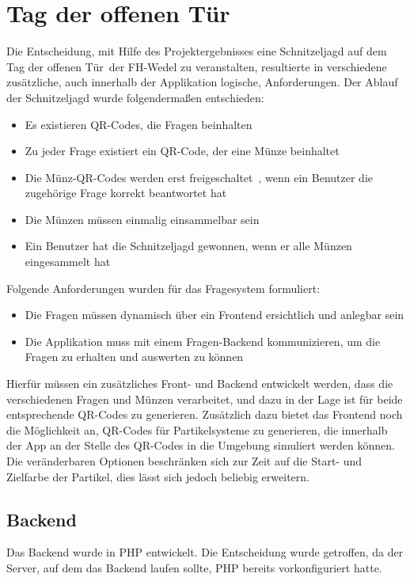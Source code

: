 \chapter{Tag der offenen Tür}

Die Entscheidung, mit Hilfe des Projektergebnisses eine Schnitzeljagd auf dem \glqq Tag der offenen Tür\grqq\ der FH-Wedel zu veranstalten, resultierte in verschiedene zusätzliche, auch innerhalb der Applikation logische, Anforderungen.
Der Ablauf der Schnitzeljagd wurde folgendermaßen entschieden:

\begin{itemize}
\item Es existieren QR-Codes, die Fragen beinhalten
\item Zu jeder Frage existiert ein QR-Code, der eine Münze beinhaltet
\item Die Münz-QR-Codes werden erst \glqq freigeschaltet\grqq\ , wenn ein Benutzer die zugehörige Frage korrekt beantwortet hat
\item Die Münzen müssen einmalig einsammelbar sein
\item Ein Benutzer hat die Schnitzeljagd gewonnen, wenn er alle Münzen eingesammelt hat
\end{itemize}
Folgende Anforderungen wurden für das Fragesystem formuliert:

\begin{itemize}
\item Die Fragen müssen dynamisch über ein Frontend ersichtlich und anlegbar sein
\item Die Applikation muss mit einem Fragen-Backend kommunizieren, um die Fragen zu erhalten und auswerten zu können
\end{itemize}

Hierfür müssen ein zusätzliches Front- und Backend entwickelt werden, dass die verschiedenen Fragen und Münzen verarbeitet, und dazu in der Lage ist für beide entsprechende QR-Codes zu generieren.
Zusätzlich dazu bietet das Frontend noch die Möglichkeit an, QR-Codes für Partikelsysteme zu generieren, die innerhalb der App an der Stelle des QR-Codes in die Umgebung simuliert werden können. Die veränderbaren Optionen beschränken sich zur Zeit auf die Start- und Zielfarbe der Partikel, dies lässt sich jedoch beliebig erweitern.

\section{Backend}
Das Backend wurde in PHP entwickelt. Die Entscheidung wurde getroffen, da der Server, auf dem das Backend laufen sollte, PHP bereits vorkonfiguriert hatte.

